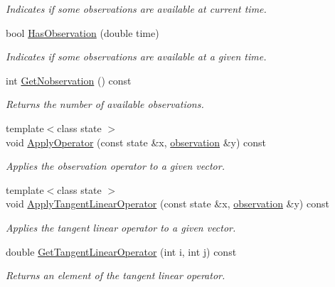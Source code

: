 \documentclass{tufte-book}
\begin{document}
\begin{DoxyCompactItemize}
\begin{DoxyCompactList}\small\item\em \-Indicates if some observations are available at current time. \end{DoxyCompactList}\item
bool \hyperlink{class_verdandi_1_1_observation_manager_template_a28a85c86b51e1b9e9d7de23a8b3b1a89}{\-Has\-Observation} (double time)
\begin{DoxyCompactList}\small\item\em \-Indicates if some observations are available at a given time. \end{DoxyCompactList}\item
int \hyperlink{class_verdandi_1_1_observation_manager_template_a833c18e713a3ba86504ec7ba4d7dbf23}{\-Get\-Nobservation} () const
\begin{DoxyCompactList}\small\item\em \-Returns the number of available observations. \end{DoxyCompactList}\item
{\footnotesize template$<$class state $>$ }\\void \hyperlink{class_verdandi_1_1_observation_manager_template_af74c6ac2db6ff368233646f435b8cb9a}{\-Apply\-Operator} (const state \&x, \hyperlink{class_verdandi_1_1_observation_manager_template_ae5afff62ea0f6f0926e80467c6d14ec6}{observation} \&y) const
\begin{DoxyCompactList}\small\item\em \-Applies the observation operator to a given vector. \end{DoxyCompactList}\item
{\footnotesize template$<$class state $>$ }\\void \hyperlink{class_verdandi_1_1_observation_manager_template_aa9333b527355f5995661cf4feebd5630}{\-Apply\-Tangent\-Linear\-Operator} (const state \&x, \hyperlink{class_verdandi_1_1_observation_manager_template_ae5afff62ea0f6f0926e80467c6d14ec6}{observation} \&y) const
\begin{DoxyCompactList}\small\item\em \-Applies the tangent linear operator to a given vector. \end{DoxyCompactList}\item
double \hyperlink{class_verdandi_1_1_observation_manager_template_a3c06471b6789417e55269b3e97cf624d}{\-Get\-Tangent\-Linear\-Operator} (int i, int j) const
\begin{DoxyCompactList}\small\item\em \-Returns an element of the tangent linear operator. \end{DoxyCompactList}\item

\end{DoxyCompactItemize}
\end{document}
